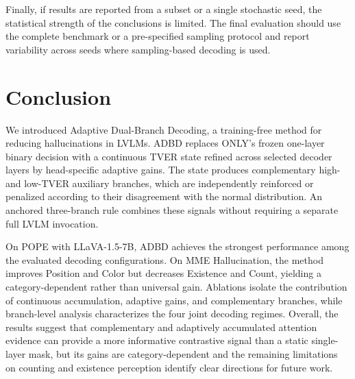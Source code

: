 Finally, if results are reported from a subset or a single stochastic seed, the statistical strength of the conclusions is limited. The final evaluation should use the complete benchmark or a pre-specified sampling protocol and report variability across seeds where sampling-based decoding is used.

\section{Conclusion}
\label{sec:conclusion}

We introduced Adaptive Dual-Branch Decoding, a training-free method for reducing hallucinations in LVLMs. ADBD replaces ONLY's frozen one-layer binary decision with a continuous TVER state refined across selected decoder layers by head-specific adaptive gains. The state produces complementary high- and low-TVER auxiliary branches, which are independently reinforced or penalized according to their disagreement with the normal distribution. An anchored three-branch rule combines these signals without requiring a separate full LVLM invocation.

On POPE with LLaVA-1.5-7B, ADBD achieves the strongest performance among the evaluated decoding configurations. On MME Hallucination, the method improves Position and Color but decreases Existence and Count, yielding a category-dependent rather than universal gain. Ablations isolate the contribution of continuous accumulation, adaptive gains, and complementary branches, while branch-level analysis characterizes the four joint decoding regimes. Overall, the results suggest that complementary and adaptively accumulated attention evidence can provide a more informative contrastive signal than a static single-layer mask, but its gains are category-dependent and the remaining limitations on counting and existence perception identify clear directions for future work.